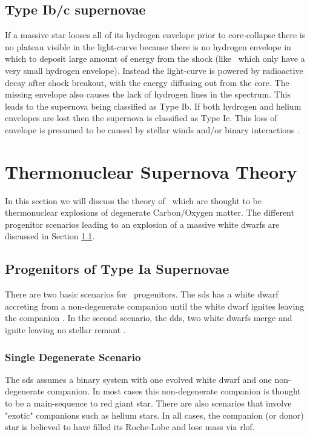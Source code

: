 \subsection{Type Ib/c supernovae}
If a massive star looses all of its hydrogen envelope prior to core-collapse there is no plateau visible in the light-curve because there is no hydrogen envelope in which to deposit large amount of energy from the shock (like \sneiil\ which only have a very small hydrogen envelope). Instead the light-curve is powered by radioactive decay after shock breakout, with the energy diffusing out from the core. The missing envelope also causes the lack of hydrogen lines in the spectrum. This leads to the supernova being classified as Type Ib. If both hydrogen and helium envelopes are lost then the supernova is classified as Type Ic. 
This loss of envelope is presumed to be caused by stellar winds and/or binary interactions \citep{1992ApJ...391..246P}. 


\section{Thermonuclear Supernova Theory}
In this section we will discuss the theory of \sneia\ which are thought to be thermonuclear explosions of degenerate Carbon/Oxygen matter. The different progenitor scenarios leading to an explosion of a massive white dwarfs are discussed in Section \ref{sec:snia_progenitor}.



\subsection{Progenitors of Type Ia Supernovae}
\label{sec:snia_progenitor}

There are two basic scenarios for \sneia\ progenitors. The \gls{sds} has a white dwarf accreting from a non-degenerate companion until the white dwarf ignites leaving the companion \citep[first introduced by][]{1973ApJ...186.1007W}. In the second scenario,  the \gls{dds}, two white dwarfs merge and ignite leaving no stellar remant \citep[first suggested by][]{1984ApJ...277..355W,1984ApJS...54..335I}. 

\subsubsection{Single Degenerate Scenario}
The \gls{sds} assumes a binary system with one evolved white dwarf and one non-degenerate companion. In most cases this non-degenerate companion is thought to be a main-sequence to red giant star. There are also scenarios that involve "exotic" companions such as helium stars. In all cases, the companion (or donor) star is believed to have filled its Roche-Lobe and lose mass via \gls{rlof}.

